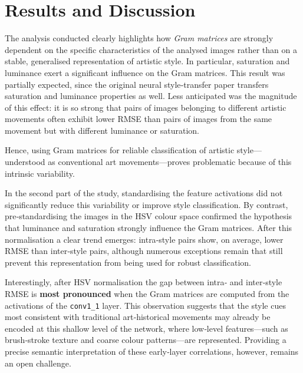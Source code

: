 \documentclass[a4paper,11pt]{article}
\begin{document}
\section{Results and Discussion}

The analysis conducted clearly highlights how \emph{Gram matrices} are strongly dependent on the specific characteristics of the analysed images rather than on a stable, generalised representation of artistic style. In particular, saturation and luminance exert a significant influence on the Gram matrices. This result was partially expected, since the original neural style‑transfer paper transfers saturation and luminance properties as well. Less anticipated was the magnitude of this effect: it is so strong that pairs of images belonging to different artistic movements often exhibit lower RMSE than pairs of images from the same movement but with different luminance or saturation.

Hence, using Gram matrices for reliable classification of artistic style—understood as conventional art movements—proves problematic because of this intrinsic variability.

In the second part of the study, standardising the feature activations did not significantly reduce this variability or improve style classification. By contrast, pre‑standardising the images in the HSV colour space confirmed the hypothesis that luminance and saturation strongly influence the Gram matrices. After this normalisation a clear trend emerges: intra‑style pairs show, on average, lower RMSE than inter‑style pairs, although numerous exceptions remain that still prevent this representation from being used for robust classification.

Interestingly, after HSV normalisation the gap between intra‑ and inter‑style RMSE is \textbf{most pronounced} when the Gram matrices are computed from the activations of the \texttt{conv1\_1} layer. This observation suggests that the style cues most consistent with traditional art‑historical movements may already be encoded at this shallow level of the network, where low‑level features—such as brush‑stroke texture and coarse colour patterns—are represented. Providing a precise semantic interpretation of these early‑layer correlations, however, remains an open challenge.
\end{document}
